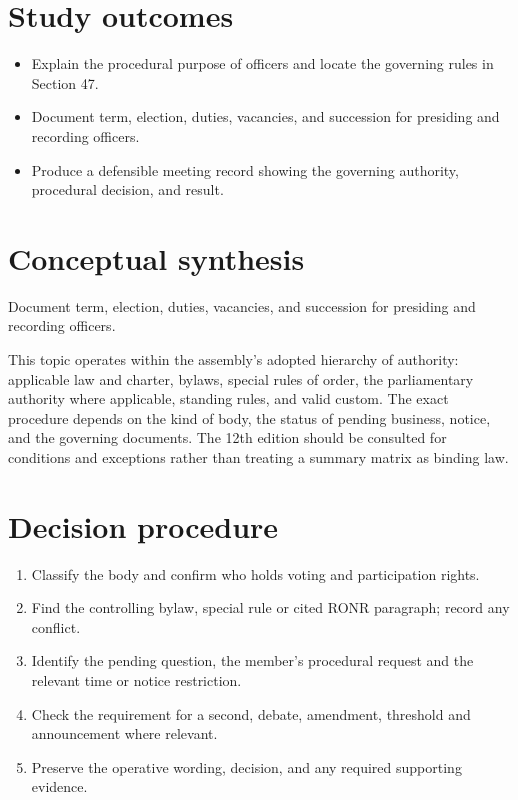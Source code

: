 \documentclass[11pt]{article}
\begin{document}
\SuiteOpen
{}
\section{Study outcomes}
\begin{itemize}[leftmargin=*,itemsep=4pt]
\item Explain the procedural purpose of officers and locate the governing rules in Section 47.
\item Document term, election, duties, vacancies, and succession for presiding and recording officers.
\item Produce a defensible meeting record showing the governing authority, procedural decision, and result.
\end{itemize}

\section{Conceptual synthesis}
Document term, election, duties, vacancies, and succession for presiding and recording officers.

This topic operates within the assembly’s adopted hierarchy of authority: applicable law and charter, bylaws, special rules of order, the parliamentary authority where applicable, standing rules, and valid custom. The exact procedure depends on the kind of body, the status of pending business, notice, and the governing documents. The 12th edition should be consulted for conditions and exceptions rather than treating a summary matrix as binding law.
\section{Decision procedure}
\begin{enumerate}[leftmargin=*,itemsep=4pt]
\item Classify the body and confirm who holds voting and participation rights.
\item Find the controlling bylaw, special rule or cited RONR paragraph; record any conflict.
\item Identify the pending question, the member’s procedural request and the relevant time or notice restriction.
\item Check the requirement for a second, debate, amendment, threshold and announcement where relevant.
\item Preserve the operative wording, decision, and any required supporting evidence.
\end{enumerate}
\end{document}
